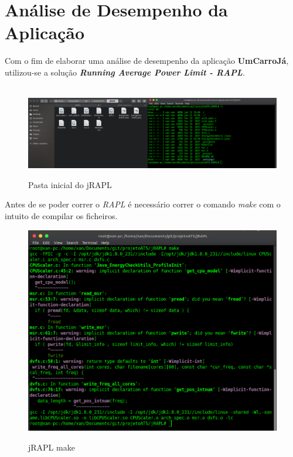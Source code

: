 \vspace{1cm}
\section{Análise de Desempenho da Aplicação}

Com o fim de elaborar uma análise de desempenho da aplicação \textbf{UmCarroJá}, utilizou-se a solução \textit{\textbf{Running Average Power Limit - RAPL}}.

\begin{figure}[H]
    \hbox{\hspace{-8em} \includegraphics[width=1.5\textwidth]{images/rapl_inicial.png}}
    \label{fig47}
    \caption{Pasta inicial do jRAPL}
\end{figure}

\par Antes de se poder correr o \textit{RAPL} é necessário correr o comando \textit{make} com o intuito de compilar os ficheiros.\newline

\begin{figure}[H]
    \centering
    \includegraphics[scale=0.27]{images/rapl_make.png}
    \label{fig48}
    \caption{jRAPL make}
\end{figure}


